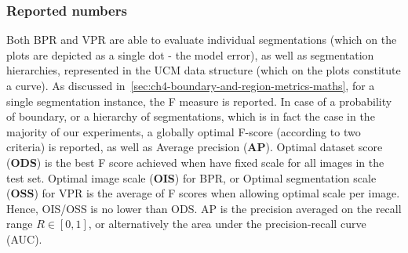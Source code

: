 
\subsubsection*{Reported numbers}
Both BPR and VPR are able to evaluate individual segmentations (which on the plots are depicted as a single dot - the model error), as well as segmentation hierarchies, represented in the UCM data structure (which on the plots constitute a curve). As discussed in~\ref{sec:ch4-boundary-and-region-metrics-maths}, for a single segmentation instance, the F measure is reported. 
In case of a probability of boundary, or a hierarchy of segmentations, which is in fact the case in the majority of our experiments, a globally optimal F-score (according to two criteria) is reported, as well as Average precision (\textbf{AP}). 
Optimal dataset score (\textbf{ODS}) is the best F score achieved when have fixed scale for all images in the test set. 
Optimal image scale (\textbf{OIS}) for BPR, or Optimal segmentation scale (\textbf{OSS}) for VPR is the average of F scores when allowing optimal scale per image. Hence, OIS\slash OSS is no lower than ODS. 
AP is the precision averaged on the recall range $R\in[0,1]$, or alternatively the area under the precision-recall curve (AUC).

